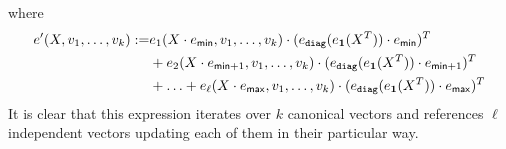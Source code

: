where 
\begin{align}
e'(X,v_1,\ldots,v_k):=&e_1(X\cdot e_{\mathsf{min}},v_1,\ldots,v_k)\cdot (e_{\texttt{diag}}(e_{\mathbf{1}}(X^T))\cdot e_{\mathsf{min}})^T \\
&+ e_2(X\cdot e_{\mathsf{min} + 1},v_1,\ldots,v_k)\cdot (e_{\texttt{diag}}(e_{\mathbf{1}}(X^T))\cdot e_{\mathsf{min} + 1})^T \\
&+ \ldots + e_\ell(X\cdot e_{\mathsf{max}},v_1,\ldots,v_k)\cdot (e_{\texttt{diag}}(e_{\mathbf{1}}(X^T))\cdot e_{\mathsf{max}})^T
\end{align}
It is clear that this expression iterates over $k$ canonical vectors and references $\ell$ independent vectors updating each of them in their particular way.
